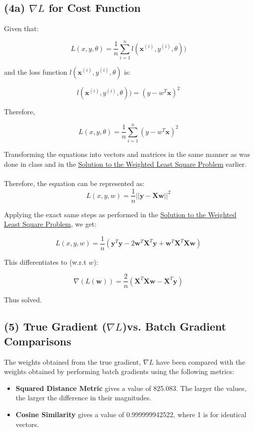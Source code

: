 \documentclass[10pt]{article}
\begin{document}
\subsection{(4a) $\nabla L$ for Cost Function}

Given that: 

\[
L(x,y,\theta) = 
\frac{1}{n}
\sum_{i =1}^{n}
l(\textbf{x}^{(i)},y^{(i)},\theta))
\]

and the loss function $l(\textbf{x}^{(i)},y^{(i)},\theta)$ is: 

\[
l(\textbf{x}^{(i)},y^{(i)},\theta)) = 
(y - w^{T}\textbf{x})^{2}
\]

Therefore, 

\[
L(x,y,\theta) = 
\frac{1}{n}
\sum_{i =1}^{n}
(y - w^{T}\textbf{x})^{2}
\]

Transforming the equations into vectors and matrices in the same manner as was done in class and in the  \hyperref[sec:lsp]{Solution to the Weighted Least Square Problem} earlier.
\\ \\
Therefore, the equation can be represented as: 
\[
L(x,y,w) = 
\frac{1}{n}
||\textbf{y} - \textbf{Xw}||^{2}
\]

Applying the exact same steps as performed in the \hyperref[sec:lsp]{Solution to the Weighted Least Square Problem}, we get: 

\[ 
L(x,y,w) = 
\frac{1}{n} 
(\textbf{y}^T\textbf{y}
- 2\textbf{w}^T\textbf{X}^T\textbf{y}
+ \textbf{w}^T\textbf{X}^T\textbf{X}\textbf{w}
)
\]

This differentiates to (w.r.t $w$):

\[
\nabla(L(\textbf{w})) = 
\frac{2}{n} 
(
\textbf{X}^T\textbf{X}\textbf{w}
-\textbf{X}^T\textbf{y}
)
\]

Thus solved.

\subsection{(5) True Gradient ($\nabla L$)vs. Batch Gradient Comparisons}

The weights obtained from the true gradient, $\nabla L$ have been compared with the weights obtained by performing batch gradients using the following metrics: 

\begin{itemize}
\item \textbf{Squared Distance Metric} gives a value of 825.083. The larger the values, the larger the difference in their magnitudes.
\item \textbf{Cosine Similarity} gives a value of 0.999999942522, where 1 is for identical vectors.
\end{itemize}
\end{document}
